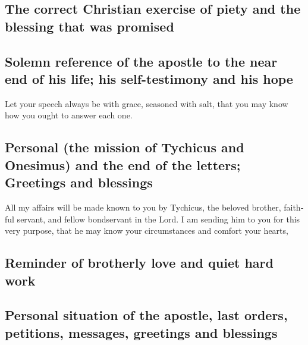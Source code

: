 \begin{paracol}{2}
\begin{otherlanguage}{english}
\hypertarget{the-correct-christian-exercise-of-piety-and-the-blessing-that-was-promised}{%
\subsection{The correct Christian exercise of piety and the blessing
that was
promised}\label{the-correct-christian-exercise-of-piety-and-the-blessing-that-was-promised}}

\hypertarget{solemn-reference-of-the-apostle-to-the-near-end-of-his-life-his-self-testimony-and-his-hope}{%
\subsection{Solemn reference of the apostle to the near end of his life;
his self-testimony and his
hope}\label{solemn-reference-of-the-apostle-to-the-near-end-of-his-life-his-self-testimony-and-his-hope}}

 Let your speech always be with grace, seasoned with salt,
that you may know how you ought to answer each one.

\hypertarget{personal-the-mission-of-tychicus-and-onesimus-and-the-end-of-the-letters-greetings-and-blessings}{%
\subsection{Personal (the mission of Tychicus and Onesimus) and the end
of the letters; Greetings and
blessings}\label{personal-the-mission-of-tychicus-and-onesimus-and-the-end-of-the-letters-greetings-and-blessings}}

 All my affairs will be made known to you by Tychicus, the
beloved brother, faithful servant, and fellow bondservant in the Lord.
 I am sending him to you for this very purpose, that he
may know your circumstances and comfort your hearts,

\hypertarget{reminder-of-brotherly-love-and-quiet-hard-work}{%
\subsection{Reminder of brotherly love and quiet hard
work}\label{reminder-of-brotherly-love-and-quiet-hard-work}}

\hypertarget{personal-situation-of-the-apostle-last-orders-petitions-messages-greetings-and-blessings}{%
\subsection{Personal situation of the apostle, last orders, petitions,
messages, greetings and
blessings}\label{personal-situation-of-the-apostle-last-orders-petitions-messages-greetings-and-blessings}}


\end{otherlanguage}
\end{paracol}
